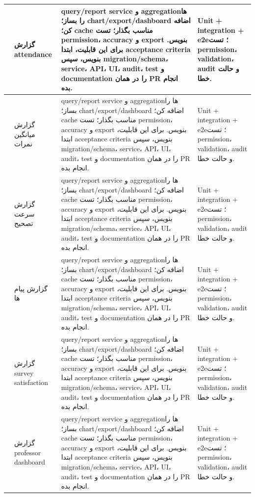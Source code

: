\documentclass[11pt,a4paper]{article}
\begin{document}
\begin{longtable}{|>{\raggedleft\arraybackslash}p{}|>{\raggedleft\arraybackslash}p{}|>{\raggedleft\arraybackslash}p{}|>{\raggedleft\arraybackslash}p{}|}
246 & گزارش attendance & query/report service و aggregationها را بساز؛ chart/export/dashboard اضافه کن؛ cache مناسب بگذار؛ تست permission، accuracy و export بنویس. برای این قابلیت، ابتدا acceptance criteria بنویس، سپس migration/schema، service، API، UI، audit، test و documentation را در همان PR انجام بده. & Unit + integration + e2e؛ تست permission، validation، audit و حالت خطا. \\ \hline
247 & گزارش میانگین نمرات & query/report service و aggregationها را بساز؛ chart/export/dashboard اضافه کن؛ cache مناسب بگذار؛ تست permission، accuracy و export بنویس. برای این قابلیت، ابتدا acceptance criteria بنویس، سپس migration/schema، service، API، UI، audit، test و documentation را در همان PR انجام بده. & Unit + integration + e2e؛ تست permission، validation، audit و حالت خطا. \\ \hline
248 & گزارش سرعت تصحیح & query/report service و aggregationها را بساز؛ chart/export/dashboard اضافه کن؛ cache مناسب بگذار؛ تست permission، accuracy و export بنویس. برای این قابلیت، ابتدا acceptance criteria بنویس، سپس migration/schema، service، API، UI، audit، test و documentation را در همان PR انجام بده. & Unit + integration + e2e؛ تست permission، validation، audit و حالت خطا. \\ \hline
249 & گزارش پیام ها & query/report service و aggregationها را بساز؛ chart/export/dashboard اضافه کن؛ cache مناسب بگذار؛ تست permission، accuracy و export بنویس. برای این قابلیت، ابتدا acceptance criteria بنویس، سپس migration/schema، service، API، UI، audit، test و documentation را در همان PR انجام بده. & Unit + integration + e2e؛ تست permission، validation، audit و حالت خطا. \\ \hline
250 & گزارش survey satisfaction & query/report service و aggregationها را بساز؛ chart/export/dashboard اضافه کن؛ cache مناسب بگذار؛ تست permission، accuracy و export بنویس. برای این قابلیت، ابتدا acceptance criteria بنویس، سپس migration/schema، service، API، UI، audit، test و documentation را در همان PR انجام بده. & Unit + integration + e2e؛ تست permission، validation، audit و حالت خطا. \\ \hline
251 & گزارش professor dashboard & query/report service و aggregationها را بساز؛ chart/export/dashboard اضافه کن؛ cache مناسب بگذار؛ تست permission، accuracy و export بنویس. برای این قابلیت، ابتدا acceptance criteria بنویس، سپس migration/schema، service، API، UI، audit، test و documentation را در همان PR انجام بده. & Unit + integration + e2e؛ تست permission، validation، audit و حالت خطا. \\ \hline

\end{longtable}
\end{document}
